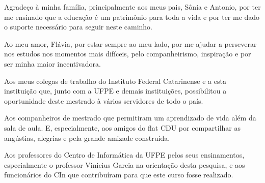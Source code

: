 \documentclass[
	12pt,				%
	openany, %
	oneside, %
	a4paper,			%
	english,			%
	french,				%
	spanish,			%
	brazil				%
	]{abntex2}
\begin{document}

      
  





\begin{agradecimentos}
Agradeço à minha família, principalmente aos meus pais, Sônia e Antonio, por ter me ensinado que a educação é um patrimônio
para toda a vida e por ter me dado o suporte necessário para seguir neste caminho.

Ao meu amor, Flávia, por estar sempre ao meu lado, por me ajudar a perseverar nos estudos nos momentos mais difíceis, pelo companheirismo, inspiração e por ser minha maior incentivadora.

Aos meus colegas de trabalho do Instituto Federal Catarinense e a esta instituição que, junto com a UFPE e demais instituições, possibilitou a oportunidade deste mestrado à vários servidores de todo o país.

Aos companheiros de mestrado que permitiram um aprendizado de vida além da sala de aula. E, especialmente, aos amigos do flat CDU por compartilhar as angústias, alegrias e pela grande amizade construída.

Aos professores do Centro de Informática da UFPE pelos seus ensinamentos, especialmente o professor Vinicius Garcia na orientação desta pesquisa, e aos funcionários do CIn que contribuíram para que este curso fosse realizado.

\end{agradecimentos}
\end{document}
